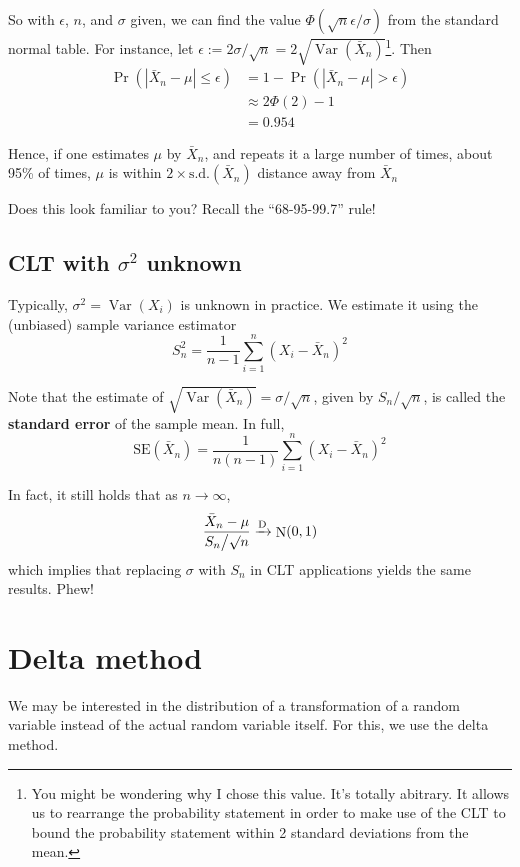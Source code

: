 \documentclass[
]{book}
\DeclareMathOperator{\Var}{Var}
\DeclareMathOperator{\N}{N}
\theoremstyle{definition}
\theoremstyle{definition}
\theoremstyle{definition}
\theoremstyle{definition}
\theoremstyle{remark}
\begin{document}
So with \(\epsilon\), \(n\), and \(\sigma\) given, we can find the value \(\Phi(\sqrt{n}\epsilon/\sigma)\) from the standard normal table.
For instance, let \(\epsilon := 2\sigma/\sqrt{n} = 2 \sqrt{\Var(\bar X_n)}\)\footnote{You might be wondering why I chose this value. It's totally abitrary. It allows us to rearrange the probability statement in order to make use of the CLT to bound the probability statement within 2 standard deviations from the mean.}.
Then
\[
\begin{aligned}
\Pr(|\bar X_n-\mu| \leq \epsilon) 
&= 1 - \Pr(|\bar X_n-\mu| > \epsilon) \\
&\approx 2\Phi(2) - 1\\
&=0.954
\end{aligned}
\]

Hence, if one estimates \(\mu\) by \(\bar X_n\), and repeats it a large number of times, about 95\% of times, \(\mu\) is within \(2 \times \text{s.d.}(\bar X_n)\) distance away from \(\bar X_n\)

Does this look familiar to you? Recall the ``68-95-99.7'' rule!

\hypertarget{clt-with-sigma2-unknown}{%
\subsection{\texorpdfstring{CLT with \(\sigma^2\) unknown}{CLT with \textbackslash sigma\^{}2 unknown}}\label{clt-with-sigma2-unknown}}

Typically, \(\sigma^2 = \Var(X_i)\) is unknown in practice.
We estimate it using the (unbiased) sample variance estimator
\[S_n^2 = \frac{1}{n-1} \sum_{i=1}^n (X_i - \bar X_n)^2\]

Note that the estimate of \(\sqrt{\Var(\bar X_n)} = \sigma/\surd n\), given by \(S_n/\surd n\), is called the \textbf{standard error} of the sample mean.
In full,
\[\text{SE}(\bar X_n) = \frac{1}{n(n-1)}\sum_{i=1}^n (X_i - \bar X_n)^2\]

In fact, it still holds that as \(n\to\infty\),
\[\frac{\bar X_n - \mu}{S_n\big/\surd n} \xrightarrow{\text D} \N(0,1)\]
which implies that replacing \(\sigma\) with \(S_n\) in CLT applications yields the same results. Phew!

\hypertarget{delta-method}{%
\section{Delta method}\label{delta-method}}

We may be interested in the distribution of a transformation of a random variable instead of the actual random variable itself.
For this, we use the delta method.
\end{document}
